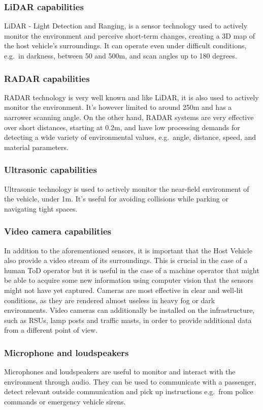 \subsubsection{LiDAR capabilities}
LiDAR - Light Detection and Ranging, is a sensor technology used to actively monitor the environment and perceive short-term changes, creating a 3D map of the host vehicle's surroundings. It can operate even under difficult conditions, e.g.\ in darkness, between 50 and 500m, and scan angles up to 180 degrees.

\subsubsection{RADAR capabilities}
RADAR technology is very well known and like LiDAR, it is also used to actively monitor the environment. It's however limited to around 250m and has a narrower scanning angle. On the other hand, RADAR systems are very effective over short distances, starting at 0.2m, and have low processing demands for detecting a wide variety of environmental values, e.g.\ angle, distance, speed, and material parameters.

\subsubsection{Ultrasonic capabilities}
Ultrasonic technology is used to actively monitor the near-field environment of the vehicle, under 1m. It's useful for avoiding collisions while parking or navigating tight spaces.

\subsubsection{Video camera capabilities}
In addition to the aforementioned sensors, it is important that the Host Vehicle also provide a video stream of its surroundings. This is crucial in the case of a human ToD operator but it is useful in the case of a machine operator that might be able to acquire some new information using computer vision that the sensors might not have yet captured.
Cameras are most effective in clear and well-lit conditions, as they are rendered almost useless in heavy fog or dark environments.
Video cameras can additionally be installed on the infrastructure, such as RSUs, lamp posts and traffic masts, in order to provide additional data from a different point of view.

\subsubsection{Microphone and loudspeakers}
Microphones and loudspeakers are useful to monitor and interact with the environment through audio. They can be used to communicate with a passenger, detect relevant outside communication and pick up instructions e.g.\ from police commands or emergency vehicle sirens.

